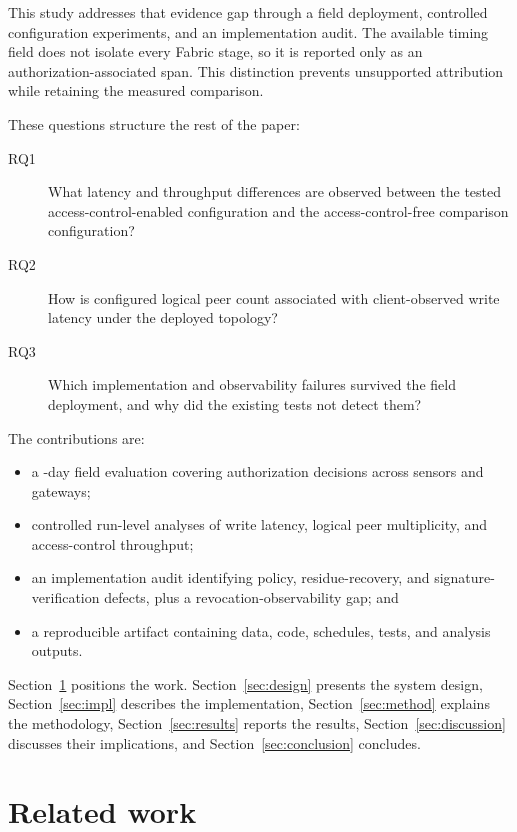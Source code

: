 \documentclass[a4paper,fleqn]{cas-dc}
\begin{document}
This study addresses that evidence gap through a field deployment, controlled
configuration experiments, and an implementation audit. The available timing
field does not isolate every Fabric stage, so it is reported only as an
authorization-associated span. This distinction prevents unsupported
attribution while retaining the measured comparison.

These questions structure the rest of the paper:

\begin{description}
\item[RQ1] What latency and throughput differences are observed between the
  tested access-control-enabled configuration and the access-control-free
  comparison configuration?
\item[RQ2] How is configured logical peer count associated with
  client-observed write latency under the deployed topology?
\item[RQ3] Which implementation and observability failures survived the
  field deployment, and why did the existing tests not detect them?
\end{description}

The contributions are:
\begin{itemize}
\item a \DeployDays{}-day field evaluation covering \TotalDecisions{}
authorization decisions across \DeploySensors{} sensors and
\DeployGateways{} gateways;
\item controlled run-level analyses of write latency, logical peer
multiplicity, and access-control throughput;
\item an implementation audit identifying policy, residue-recovery, and
signature-verification defects, plus a revocation-observability gap; and
\item a reproducible artifact containing data, code, schedules, tests, and
analysis outputs.
\end{itemize}

Section~\ref{sec:related} positions the work. Section~\ref{sec:design}
presents the system design, Section~\ref{sec:impl} describes the
implementation, Section~\ref{sec:method} explains the methodology,
Section~\ref{sec:results} reports the results, Section~\ref{sec:discussion}
discusses their implications, and Section~\ref{sec:conclusion} concludes.

\section{Related work}
\label{sec:related}
\end{document}
